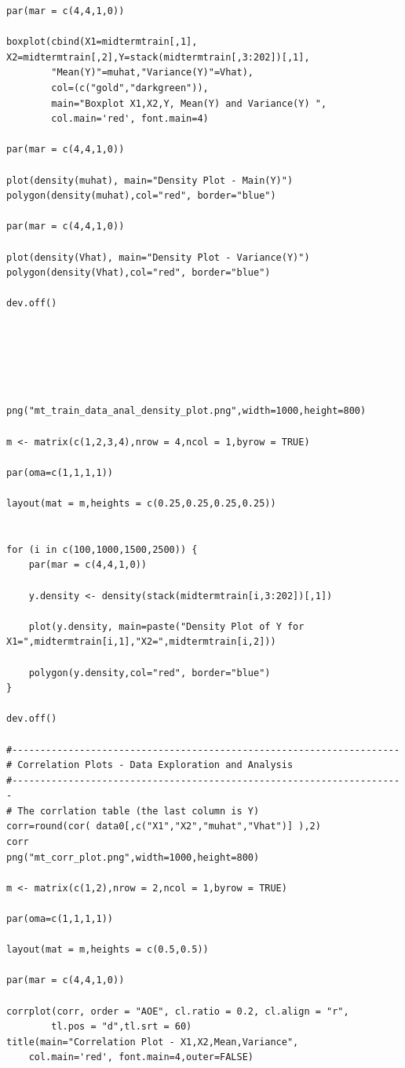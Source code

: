\documentclass[twoside,12pt]{article}
\begin{document}
\begin{verbatim}
par(mar = c(4,4,1,0))

boxplot(cbind(X1=midtermtrain[,1], X2=midtermtrain[,2],Y=stack(midtermtrain[,3:202])[,1],
		"Mean(Y)"=muhat,"Variance(Y)"=Vhat),
		col=(c("gold","darkgreen")),
		main="Boxplot X1,X2,Y, Mean(Y) and Variance(Y) ",
		col.main='red', font.main=4)

par(mar = c(4,4,1,0))

plot(density(muhat), main="Density Plot - Main(Y)")
polygon(density(muhat),col="red", border="blue")

par(mar = c(4,4,1,0))

plot(density(Vhat), main="Density Plot - Variance(Y)")
polygon(density(Vhat),col="red", border="blue")

dev.off()






png("mt_train_data_anal_density_plot.png",width=1000,height=800)

m <- matrix(c(1,2,3,4),nrow = 4,ncol = 1,byrow = TRUE)

par(oma=c(1,1,1,1))

layout(mat = m,heights = c(0.25,0.25,0.25,0.25))


for (i in c(100,1000,1500,2500)) {
	par(mar = c(4,4,1,0))

	y.density <- density(stack(midtermtrain[i,3:202])[,1])

	plot(y.density, main=paste("Density Plot of Y for X1=",midtermtrain[i,1],"X2=",midtermtrain[i,2]))

	polygon(y.density,col="red", border="blue")
}

dev.off()

#---------------------------------------------------------------------
# Correlation Plots - Data Exploration and Analysis
#----------------------------------------------------------------------
# The corrlation table (the last column is Y)
corr=round(cor( data0[,c("X1","X2","muhat","Vhat")] ),2)
corr
png("mt_corr_plot.png",width=1000,height=800)

m <- matrix(c(1,2),nrow = 2,ncol = 1,byrow = TRUE)

par(oma=c(1,1,1,1))

layout(mat = m,heights = c(0.5,0.5))

par(mar = c(4,4,1,0))

corrplot(corr, order = "AOE", cl.ratio = 0.2, cl.align = "r",
		tl.pos = "d",tl.srt = 60)
title(main="Correlation Plot - X1,X2,Mean,Variance",
	col.main='red', font.main=4,outer=FALSE)


\end{verbatim}
\end{document}
